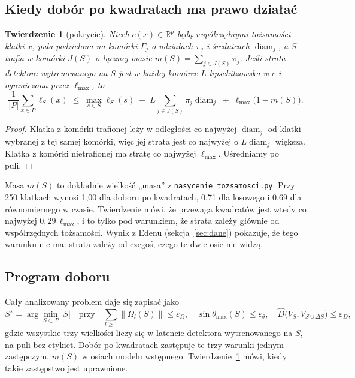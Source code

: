 \documentclass[11pt,a4paper]{article}
\newtheorem{twierdzenie}{Twierdzenie}
\theoremstyle{definition}
\theoremstyle{remark}
\newcommand{\R}{\mathbb{R}}
\newcommand{\norm}[1]{\lVert #1\rVert}
\begin{document}
\subsection*{Kiedy dobór po kwadratach ma prawo działać}

\begin{twierdzenie}[pokrycie]\label{tw:pokrycie}
Niech $c(x)\in\R^p$ będą współrzędnymi tożsamości klatki $x$, pula podzielona na komórki $\Gamma_j$ o udziałach
$\pi_j$ i średnicach $\operatorname{diam}_j$, a $S$ trafia w komórki $J(S)$ o łącznej masie
$m(S) = \sum_{j\in J(S)}\pi_j$. Jeśli strata detektora wytrenowanego na $S$ jest w każdej komórce
$L$-lipschitzowska w $c$ i ograniczona przez $\ell_{\max}$, to
\[
\frac{1}{|P|}\sum_{x\in P}\ell_S(x) \;\le\; \max_{s\in S}\ell_S(s) \;+\; L\sum_{j\in J(S)}\pi_j\operatorname{diam}_j
\;+\; \ell_{\max}\bigl(1-m(S)\bigr).
\]
\end{twierdzenie}

\begin{proof}
Klatka z komórki trafionej leży w odległości co najwyżej $\operatorname{diam}_j$ od klatki wybranej z tej samej
komórki, więc jej strata jest co najwyżej o $L\operatorname{diam}_j$ większa. Klatka z komórki nietrafionej
ma stratę co najwyżej $\ell_{\max}$. Uśredniamy po puli.
\end{proof}

Masa $m(S)$ to dokładnie wielkość „masa” z \texttt{nasycenie\_tozsamosci.py}. Przy 250 klatkach wynosi 1,00
dla doboru po kwadratach, 0,71 dla losowego i 0,69 dla równomiernego w czasie. Twierdzenie mówi, że przewaga
kwadratów jest wtedy co najwyżej $0{,}29\,\ell_{\max}$, i to tylko pod warunkiem, że strata zależy głównie
od współrzędnych tożsamości. Wynik z Edenu (sekcja~\ref{sec:dane}) pokazuje, że tego warunku nie ma:
strata zależy od czegoś, czego te dwie osie nie widzą.

\subsection*{Program doboru}
Cały analizowany problem daje się zapisać jako
\[
S^\star = \arg\min_{S\subset P}|S|\quad\text{przy}\quad
\sum_{l\ge1}\norm{\Omega_l(S)}\le\varepsilon_\Omega,\quad
\sin\theta_{\max}(S)\le\varepsilon_\theta,\quad
\widehat D\bigl(V_S, V_{S\cup\Delta S}\bigr)\le\varepsilon_D,
\]
gdzie wszystkie trzy wielkości liczy się w latencie detektora wytrenowanego na $S$, na puli bez etykiet.
Dobór po kwadratach zastępuje te trzy warunki jednym zastępczym, $m(S)$ w osiach modelu wstępnego.
Twierdzenie~\ref{tw:pokrycie} mówi, kiedy takie zastępstwo jest uprawnione.
\end{document}
